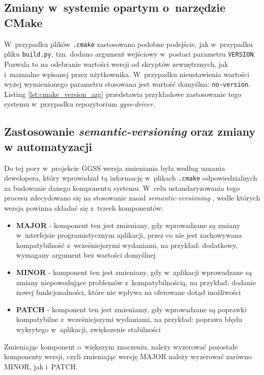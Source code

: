 \subsection{Zmiany w~systemie opartym o~narzędzie CMake}
W~przypadku plików \lstinline{.cmake} zastosowano podobne podejście, jak w~przypadku pliku \lstinline{build.py}, tzn. dodano argument wejściowy w~postaci parametru \lstinline{VERSION}. Pozwala to na odebranie wartości wersji od skryptów zewnętrznych, jak i~manualne wpisanej przez użytkownika. W~przypadku nieustawienia wartości wyżej wymienionego parametru stosowana jest wartość domyślna: \lstinline{no-version}. Listing \ref{lst:cmake_version_arg} przedstawia przykładowe zastosowanie tego systemu w~przypadku repozytorium \emph{ggss-driver}.




\subsection{Zastosowanie \emph{semantic-versioning} oraz zmiany w automatyzacji}
Do tej pory w~projekcie GGSS wersja zmieniania była według uznania dewelopera, który wprowadzał tą informację w~plikach \lstinline{.cmake} odpowiedzialnych za budowanie danego komponentu systemu. W~celu ustandaryzowania tego procesu zdecydowano się na stosowanie zasad \emph{semantic-versioning} \cite{semver}, wedle których wersja powinna składać się z~trzech komponentów:
\begin{itemize}
    \item \textbf{MAJOR} - komponent ten jest zmieniany, gdy wprowadzane są zmiany w~interfejsie programistycznym aplikacji, przez co nie jest zachowywana kompatybilność z~wcześniejszymi wydaniami, na przykład: dodatkowy, wymagany argument bez wartości domyślnej
    \item \textbf{MINOR} - komponent ten jest zmieniany, gdy w~aplikacji wprowadzane są zmiany niepowodujące problemów z~kompatybilnością, na przykład: dodanie nowej funkcjonalności, które nie wpływa na oferowane dotąd możliwości
    \item \textbf{PATCH} - komponent ten jest zmieniamy, gdy wprowadzane są poprawki kompatybilne z~wcześniejszymi wydaniami, na przykład: poprawa błędu wykrytego w~aplikacji, zwiększenie stabilności
\end{itemize}
Zmieniając komponent o~większym znaczeniu, należy wyzerować pozostałe komponenty wersji, czyli zmieniając wersję MAJOR należy wyzerować zarówno MINOR, jak i~PATCH.

